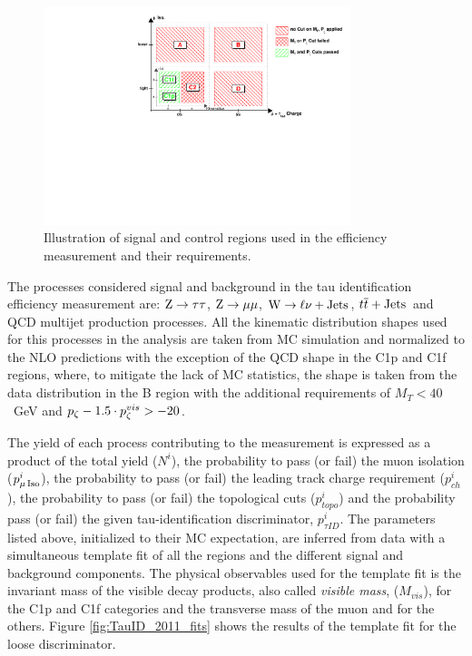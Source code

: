 \begin{figure}
\begin{center}
\includegraphics[angle=-0,width=0.8\textwidth]{3_Evt_Reconstruction/pics/figTauIdEffIllustration.pdf}
\caption{Illustration of signal and control regions used in the efficiency measurement and their requirements.
\label{fig:tau_eff_ABCD}
}
\end{center}
\end{figure}

The processes considered signal and background in the tau identification efficiency measurement %
are: $\Z\To\tau\tau$, $\Z\To\mu\mu$, $\W\To\ell\nu+\rm{Jets}$, $t\anti{t}+\rm{Jets}$\ and QCD multijet production processes. All the kinematic distribution shapes used for this processes in the analysis are taken from MC simulation and normalized to the NLO predictions with the exception of the QCD shape in the C1p and C1f regions, where, to mitigate the lack of MC statistics, the shape is taken from the data distribution in the B region with the additional requirements of $M_T < 40$\ GeV and $\pz -1.5 \cdot \pz^{vis} > -20$. 

The yield of each process contributing to the measurement is expressed as a product of the total yield ($N^i$), the probability to pass (or fail) the muon isolation ($p_{\mu\,\rm{Iso}}^i$), the probability to pass (or fail) the leading track charge requirement ($p_{ch}^i$), the probability to pass (or fail) the topological cuts ($p_{topo}^i$) and the probability pass (or fail) the given tau-identification discriminator, $p_{\tau ID}^i$. The parameters listed above, initialized to their MC expectation, are inferred from data with a simultaneous template fit of all the regions and the different signal and background components. The physical observables used for the template fit is the invariant mass of the visible decay products, also called \emph{visible mass}, ($M_{vis}$), for the C1p and C1f categories and the transverse mass of the muon and \MET for the others. Figure \ref{fig:TauID_2011_fits} shows the results of the template fit for the loose discriminator.

